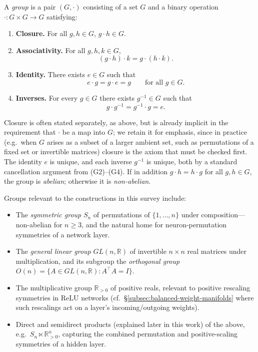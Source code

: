 \documentclass[mathematics,review,submit,moreauthors]{Definitions/mdpi}
\begin{document}
\begin{Definition}[Group]\label{def:group}
A \emph{group} is a pair $(G, \cdot)$ consisting of a set $G$ and a binary
operation $\cdot : G \times G \to G$ satisfying:
    \begin{enumerate}[label=(G\arabic*), leftmargin=*, labelsep=0.5em]
        \item \textbf{Closure.} For all $g, h \in G$, $g \cdot h \in G$.
        \item \textbf{Associativity.} For all $g, h, k \in G$,
        \[
            (g \cdot h) \cdot k = g \cdot (h \cdot k).
        \]
        \item \textbf{Identity.} There exists $e \in G$ such that
        \[
            e \cdot g = g \cdot e = g \qquad \text{for all } g \in G.
        \]
        \item \textbf{Inverses.} For every $g \in G$ there exists
        $g^{-1} \in G$ such that
        \[
            g \cdot g^{-1} = g^{-1} \cdot g = e.
        \]
    \end{enumerate}
\end{Definition}

Closure is often stated separately, as above, but is already implicit in the
requirement that $\cdot$ be a map into $G$; we retain it for emphasis, since
in practice (e.g.\ when $G$ arises as a subset of a larger ambient set, such
as permutations of a fixed set or invertible matrices) closure is the axiom
that must be checked first. The identity $e$ is unique, and each inverse
$g^{-1}$ is unique, both by a standard cancellation argument from (G2)--(G4).
If in addition $g \cdot h = h \cdot g$ for all $g,h \in G$, the group is
\emph{abelian}; otherwise it is \emph{non-abelian}.

\begin{Example}
\label{ex:groups}
Groups relevant to the constructions in this survey include:
\begin{itemize}
    \item The \emph{symmetric group} $S_n$ of permutations of
    $\{1, \dots, n\}$ under composition---non-abelian for $n \geq 3$, and the
    natural home for neuron-permutation symmetries of a network layer.
    \item The \emph{general linear group} $GL(n, \mathbb{R})$ of invertible
    $n \times n$ real matrices under multiplication, and its subgroup the
    \emph{orthogonal group} $O(n) = \{ A \in GL(n,\mathbb{R}) : A^\top A = I \}$.
    \item The multiplicative group $\mathbb{R}_{>0}$ of positive reals,
    relevant to positive rescaling symmetries in ReLU networks
    (cf.\ \S\ref{subsec:balanced-weight-manifolds} where such rescalings act
    on a layer's incoming/outgoing weights).
    \item Direct and semidirect products (explained later in this work) of the above, e.g.\
    $S_n \ltimes \mathbb{R}_{>0}^n$, capturing the combined permutation and
    positive-scaling symmetries of a hidden layer.
\end{itemize}
\end{Example}
\end{document}
